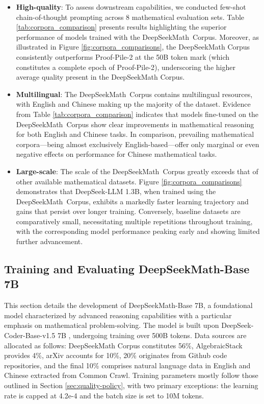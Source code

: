 \begin{itemize}[topsep=0pt]
\begin{itemize}[topsep=0pt]
    \item \textbf{High-quality}:
    To assess downstream capabilities, we conducted few-shot chain-of-thought prompting \cite{cot} across 8 mathematical evaluation sets. Table \ref{tab:corpora_comparison} presents results highlighting the superior performance of models trained with the DeepSeekMath~Corpus. Moreover, as illustrated in Figure \ref{fig:corpora_comparisons}, the DeepSeekMath Corpus consistently outperforms Proof-Pile-2 at the 50B token mark (which constitutes a complete epoch of Proof-Pile-2), underscoring the higher average quality present in the DeepSeekMath Corpus.
    \item \textbf{Multilingual}:
    The DeepSeekMath~Corpus contains multilingual resources, with English and Chinese making up the majority of the dataset. Evidence from Table \ref{tab:corpora_comparison} indicates that models fine-tuned on the DeepSeekMath~Corpus show clear improvements in mathematical reasoning for both English and Chinese tasks. In comparison, prevailing mathematical corpora—being almost exclusively English-based—offer only marginal or even negative effects on performance for Chinese mathematical tasks.
    \item \textbf{Large-scale}:
    The scale of the DeepSeekMath~Corpus greatly exceeds that of other available mathematical datasets. Figure \ref{fig:corpora_comparisons} demonstrates that DeepSeek-LLM 1.3B, when trained using the DeepSeekMath~Corpus, exhibits a markedly faster learning trajectory and gains that persist over longer training. Conversely, baseline datasets are comparatively small, necessitating multiple repetitions throughout training, with the corresponding model performance peaking early and showing limited further advancement.
\end{itemize}

\subsection{Training and Evaluating DeepSeekMath-Base 7B}

This section details the development of DeepSeekMath-Base 7B, a foundational model characterized by advanced reasoning capabilities with a particular emphasis on mathematical problem-solving. The model is built upon DeepSeek-Coder-Base-v1.5 7B \citep{deepseek-coder}, undergoing training over 500B tokens. Data sources are allocated as follows: DeepSeekMath Corpus constitutes 56\%, AlgebraicStack provides 4\%, arXiv accounts for 10\%, 20\% originates from Github code repositories, and the final 10\% comprises natural language data in English and Chinese extracted from Common Crawl. Training parameters mostly follow those outlined in Section \ref{sec:quality-policy}, with two primary exceptions: the learning rate is capped at 4.2e-4 and the batch size is set to 10M tokens.


\end{itemize}
